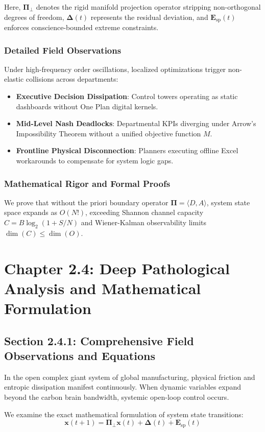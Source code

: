 \documentclass[12pt,a4paper,oneside]{book}
\begin{document}
Here, $\mathbf{\Pi}_{\bot}$ denotes the rigid manifold projection operator stripping non-orthogonal degrees of freedom, $\mathbf{\Delta}(t)$ represents the residual deviation, and $\mathbf{E}_{\mathrm{sp}}(t)$ enforces conscience-bounded extreme constraints.

\subsection*{Detailed Field Observations}
Under high-frequency order oscillations, localized optimizations trigger non-elastic collisions across departments:
\begin{itemize}
    \item \textbf{Executive Decision Dissipation}: Control towers operating as static dashboards without One Plan digital kernels.
    \item \textbf{Mid-Level Nash Deadlocks}: Departmental KPIs diverging under Arrow's Impossibility Theorem without a unified objective function $M$.
    \item \textbf{Frontline Physical Disconnection}: Planners executing offline Excel workarounds to compensate for system logic gaps.
\end{itemize}

\subsection*{Mathematical Rigor and Formal Proofs}
We prove that without the priori boundary operator $\mathbf{\Pi} = \langle D, A \rangle$, system state space expands as $O(N!)$, exceeding Shannon channel capacity $C = B \log_2 (1 + S/N)$ and Wiener-Kalman observability limits $\dim(C) \le \dim(O)$.
\clearpage
\chapter{Chapter 2.4: Deep Pathological Analysis and Mathematical Formulation}
\section{Section 2.4.1: Comprehensive Field Observations and Equations}

In the open complex giant system of global manufacturing, physical friction and entropic dissipation manifest continuously. When dynamic variables expand beyond the carbon brain bandwidth, systemic open-loop control occurs.

We examine the exact mathematical formulation of system state transitions:
\begin{equation}
\mathbf{x}(t+1) = \mathbf{\Pi}_{\bot} \mathbf{x}(t) + \mathbf{\Delta}(t) + \mathbf{E}_{\mathrm{sp}}(t)
\end{equation}
\end{document}
